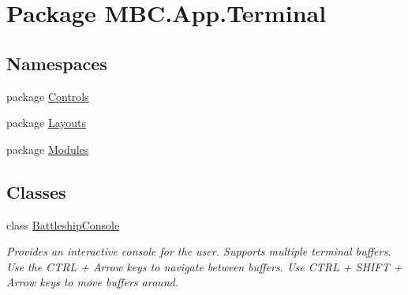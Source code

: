 \hypertarget{namespace_m_b_c_1_1_app_1_1_terminal}{\section{Package M\-B\-C.\-App.\-Terminal}
\label{namespace_m_b_c_1_1_app_1_1_terminal}
}
\subsection*{Namespaces}
\begin{DoxyCompactItemize}
\item 
package \hyperlink{namespace_m_b_c_1_1_app_1_1_terminal_1_1_controls}{Controls}
\item 
package \hyperlink{namespace_m_b_c_1_1_app_1_1_terminal_1_1_layouts}{Layouts}
\item 
package \hyperlink{namespace_m_b_c_1_1_app_1_1_terminal_1_1_modules}{Modules}
\end{DoxyCompactItemize}
\subsection*{Classes}
\begin{DoxyCompactItemize}
\item 
class \hyperlink{class_m_b_c_1_1_app_1_1_terminal_1_1_battleship_console}{Battleship\-Console}
\begin{DoxyCompactList}\small\item\em Provides an interactive console for the user. Supports multiple terminal buffers. Use the C\-T\-R\-L + Arrow keys to navigate between buffers. Use C\-T\-R\-L + S\-H\-I\-F\-T + Arrow keys to move buffers around. \end{DoxyCompactList}\end{DoxyCompactItemize}
